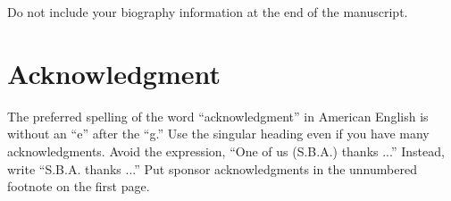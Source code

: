 \documentclass[journal]{IEEEtran}
\begin{document}
Do not include your biography information at the end of the manuscript.  



\section*{Acknowledgment}
The preferred spelling of the word ``acknowledgment'' in American English is without an ``e'' after the ``g.'' Use the singular heading even if you have many acknowledgments. Avoid the expression, ``One of us (S.B.A.) thanks ...'' Instead, write ``S.B.A. thanks ...'' Put sponsor acknowledgments in the unnumbered footnote on the first page.



%
%
%




\end{document}
